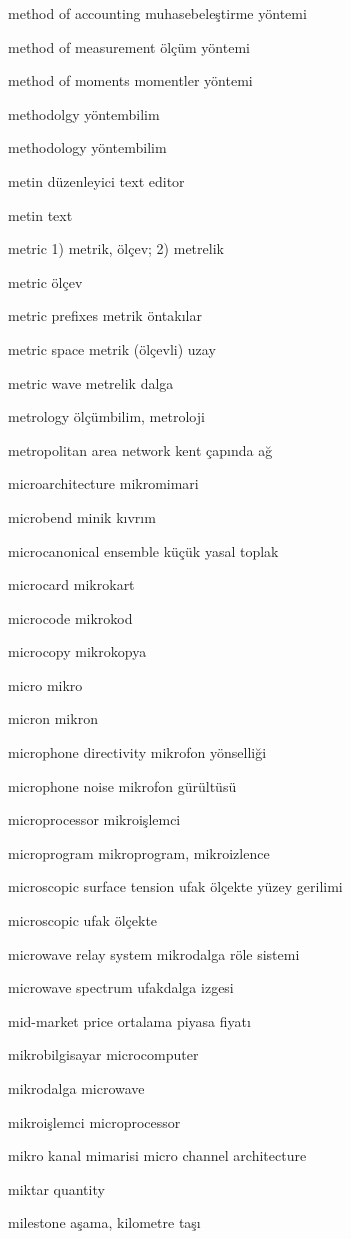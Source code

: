 \documentclass[12pt,fleqn]{article}\usepackage{../../common}
\begin{document}
method of accounting muhasebeleştirme yöntemi

method of measurement ölçüm yöntemi

method of moments momentler yöntemi

methodolgy yöntembilim

methodology yöntembilim

metin düzenleyici text editor

metin text

metric 1) metrik, ölçev; 2) metrelik

metric ölçev

metric prefixes metrik öntakılar

metric space metrik (ölçevli) uzay

metric wave metrelik dalga

metrology ölçümbilim, metroloji

metropolitan area network kent çapında ağ

microarchitecture mikromimari

microbend minik kıvrım

microcanonical ensemble küçük yasal toplak

microcard mikrokart

microcode mikrokod

microcopy mikrokopya

micro mikro

micron mikron

microphone directivity mikrofon yönselliği

microphone noise mikrofon gürültüsü

microprocessor mikroişlemci

microprogram mikroprogram, mikroizlence

microscopic surface tension ufak ölçekte yüzey gerilimi

microscopic ufak ölçekte

microwave relay system mikrodalga röle sistemi

microwave spectrum ufakdalga izgesi

mid-market price ortalama piyasa fiyatı

mikrobilgisayar microcomputer

mikrodalga microwave

mikroişlemci microprocessor

mikro kanal mimarisi micro channel architecture

miktar quantity

milestone aşama, kilometre taşı
\end{document}
